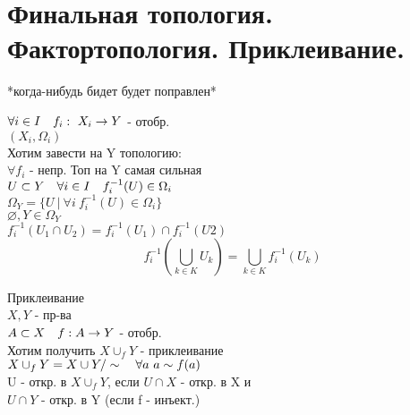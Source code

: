 \documentclass[geometry.tex]{subfiles}
\begin{document}
  \section{Финальная топология. Фактортопология. Приклеивание.}

  *когда-нибудь бидет будет поправлен*
  \begin{definition}
      $\forall i \in I \quad f_i: \ X_i \rightarrow Y$ - отобр.\\
      $(X_i, \Omega_i)$\\
      Хотим завести на Y топологию:\\
      $\forall f_i$ - непр. Топ на Y самая сильная \\
      $U \subset Y \quad \forall i \in I \quad f_i^{-1}(U) \in \Omega_i$\\
      $\Omega_Y = \{U \ | \ \forall i \ f_i^{-1}(U) \in \Omega_i\}$\\
      $\varnothing, Y \in \Omega_Y$\\
      $f_i^{-1}(U_1 \cap U_2) = f_i^{-1}(U_1) \cap f_i^{-1}(U2)$\\
      \[f_i^{-1}(\bigcup_{k \in K} U_k) = \bigcup_{k \in K} f_i^{-1}(U_k)\]
  \end{definition}

  \begin{example}
      Приклеивание\\
      $X, Y$ - пр-ва\\
      $A \subset X \quad f: A \rightarrow Y$ - отобр.\\
      Хотим получить $X \cup_f Y$ - приклеивание\\
      $X \cup_f Y = X \cup Y /\sim \quad \forall a \ a \sim f(a)$\\
      U - откр. в $X \cup_f Y$, если $U \cap X$ - откр. в X и\\ $U \cap Y$ - откр. в Y
      (если f - инъект.)
  \end{example}
\end{document}
